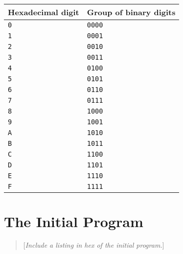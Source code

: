 \documentclass[a4paper,11pt]{article}
\newcommand{\num}[1]{\texttt{#1}\xspace}
\newcommand{\comment}[1]{\begin{quote}[\textit{#1}]\end{quote}}
\begin{document}
\begin{center}
  \begin{tabular}{@{}ll@{}}
    \hline
    Hexadecimal digit & Group of binary digits \\
    \hline
    \num{0}           & \num{0000}   \\
    \num{1}           & \num{0001}   \\
    \num{2}           & \num{0010}   \\
    \num{3}           & \num{0011}   \\
    \num{4}           & \num{0100}   \\
    \num{5}           & \num{0101}   \\
    \num{6}           & \num{0110}   \\
    \num{7}           & \num{0111}   \\
    \num{8}           & \num{1000}   \\
    \num{9}           & \num{1001}   \\
    \num{A}           & \num{1010}   \\
    \num{B}           & \num{1011}   \\
    \num{C}           & \num{1100}   \\
    \num{D}           & \num{1101}   \\
    \num{E}           & \num{1110}   \\
    \num{F}           & \num{1111}   \\
    \hline
  \end{tabular}
\end{center}

\section{The Initial Program}
\label{sec:initial-program}

\comment{Include a listing in hex of the initial program.}
\end{document}
